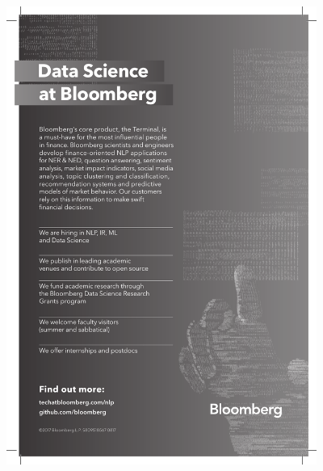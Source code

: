 \thispagestyle{empty}
\begin{center}
  \vfill
  \includegraphics[width=4in]{content/ads/platinum/bloomberg.pdf}
  \vfill
\end{center}
\clearpage
